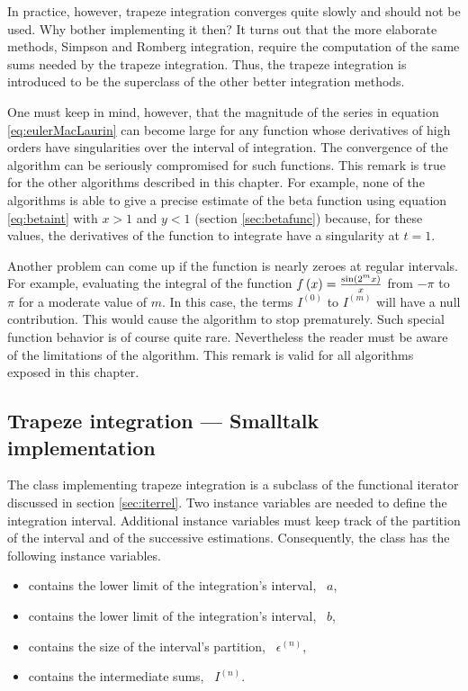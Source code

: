 In practice, however, trapeze integration converges quite slowly
and should not be used. Why bother implementing it then? It turns
out that the more elaborate methods, Simpson and Romberg
integration, require the computation of the same sums needed by
the trapeze integration. Thus, the trapeze integration is
introduced to be the superclass of the other better integration
methods.

One must keep in mind, however, that the magnitude of the series
in equation \ref{eq:eulerMacLaurin} can become large for any
function whose derivatives of high orders have singularities over
the interval of integration. The convergence of the algorithm can
be seriously compromised for such functions. This remark is true
for the other algorithms described in this chapter. For example,
none of the algorithms is able to give a precise estimate of the
beta function using equation \ref{eq:betaint} with $x>1$ and $y<1$
(\cf section \ref{sec:betafunc}) because, for these values, the
derivatives of the function to integrate have a singularity at
$t=1$.

Another problem can come up if the function is nearly zeroes at
regular intervals. For example, evaluating the integral of the
function $f\left(x\right)={\sin\left(2^mx\right)\over x}$  from
$-\pi$ to $\pi$ for a moderate value of $m$. In this case, the
terms $I^{\left(0\right)}$ to $I^{\left(m\right)}$ will have a
null contribution. This would cause the algorithm to stop
prematurely. Such special function behavior is of course quite
rare. Nevertheless the reader must be aware of the limitations of
the algorithm. This remark is valid for all algorithms exposed in
this chapter.

\subsection{Trapeze integration --- Smalltalk implementation}
\label{sec:strapeze}
The class implementing trapeze integration is a subclass of the functional iterator discussed in
section \ref{sec:iterrel}. Two instance variables are needed to
define the integration interval. Additional instance variables
must keep track of the partition of the interval and of the
successive estimations. Consequently, the class has the following
instance variables.
\begin{itemize}
\item {} contains the lower limit of the integration's interval,
 \ie\ $a$,
\item {} contains the lower limit of the integration's interval,
 \ie\ $b$,
\item {} contains the size of the interval's partition,
 \ie\ $\epsilon^{\left(n\right)}$,
\item {} contains the intermediate sums, \ie\ $I^{\left(n\right)}$.
\end{itemize}

